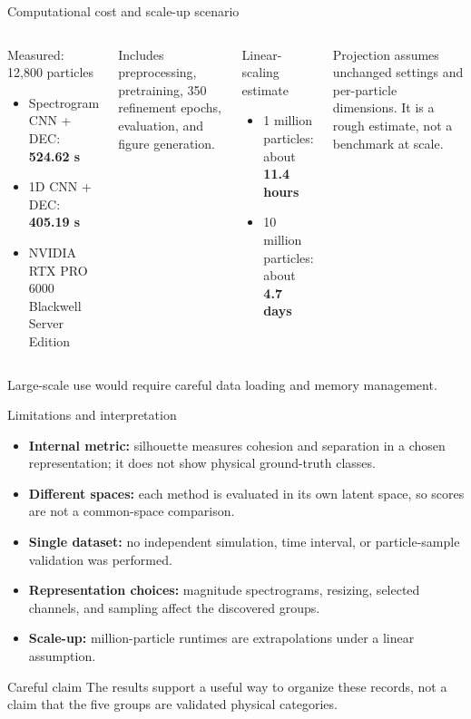 \documentclass[aspectratio=169,11pt]{beamer}
\begin{document}
\begin{frame}{Computational cost and scale-up scenario}
  \begin{columns}[T,onlytextwidth]
      \begin{block}{Measured: 12,800 particles}
        \begin{itemize}
          \item Spectrogram CNN + DEC: \textbf{524.62 s}
          \item 1D CNN + DEC: \textbf{405.19 s}
          \item NVIDIA RTX PRO 6000 Blackwell Server Edition
        \end{itemize}
      \end{block}
      \scriptsize Includes preprocessing, pretraining, 350 refinement epochs, evaluation, and figure generation.
      \begin{block}{Linear-scaling estimate}
        \begin{itemize}
          \item 1 million particles: about \textbf{11.4 hours}
          \item 10 million particles: about \textbf{4.7 days}
        \end{itemize}
      \end{block}
      \scriptsize Projection assumes unchanged settings and per-particle dimensions. It is a rough estimate, not a benchmark at scale.
  \end{columns}
  \vspace{0.45em}
  \alert{Large-scale use would require careful data loading and memory management.}
\end{frame}

\begin{frame}{Limitations and interpretation}
  \begin{itemize}
    \item \textbf{Internal metric:} silhouette measures cohesion and separation in a chosen representation; it does not show physical ground-truth classes.
    \item \textbf{Different spaces:} each method is evaluated in its own latent space, so scores are not a common-space comparison.
    \item \textbf{Single dataset:} no independent simulation, time interval, or particle-sample validation was performed.
    \item \textbf{Representation choices:} magnitude spectrograms, resizing, selected channels, and sampling affect the discovered groups.
    \item \textbf{Scale-up:} million-particle runtimes are extrapolations under a linear assumption.
  \end{itemize}
  \vspace{0.5em}
  \begin{block}{Careful claim}
    The results support a useful way to organize these records, not a claim that the five groups are validated physical categories.
  \end{block}
\end{frame}
\end{document}
